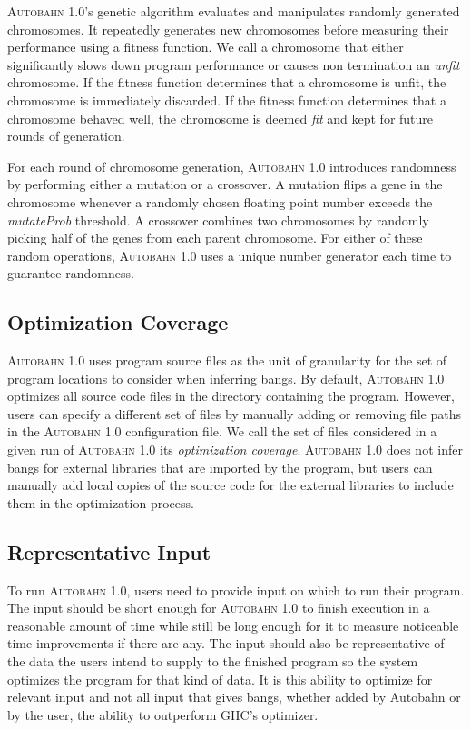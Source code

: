 \documentclass[format=sigplan, review=true, 9pt]{acmart}
\newcommand{\unfit}[0]{unfit}
\newcommand{\Ao}[0]{\textsc{Autobahn 1.0}}
\newcommand{\fit}[0]{fit}
\begin{document}
\Ao{}'s genetic algorithm evaluates and manipulates randomly generated
chromosomes. It repeatedly generates new chromosomes before measuring
their performance using a fitness function. We call a chromosome that
either significantly slows down program performance or causes non
termination an \textit{\unfit{}} chromosome. If the fitness function
determines that a chromosome is \unfit{}, the chromosome is
immediately discarded. If the fitness function determines that a
chromosome behaved well, the chromosome is deemed \textit{\fit{}} and
kept for future rounds of generation.

For each round of chromosome generation, \Ao{} introduces randomness
by performing either a mutation or a crossover. A mutation flips a
gene in the chromosome whenever a randomly chosen floating point
number exceeds the \textit{mutateProb} threshold. A crossover combines
two chromosomes by randomly picking half of the genes from each parent
chromosome. For either of these random operations, \Ao{} uses a unique
number generator each time to guarantee randomness.

\subsection{Optimization Coverage}
\Ao{} uses program source files as the unit of granularity for 
the set of program locations to consider when inferring bangs.  By
default, \Ao{} optimizes all source code files in the directory
containing the program. However, users can specify a different set of
files by manually adding or removing file paths in the \Ao{}
configuration file.  We call the set of files considered in a given
run of \Ao{} its \textit{optimization coverage}.
\Ao{} does not infer bangs for external libraries
that are imported by the program, but users can manually add local
copies of the source code for the external libraries to include them in the optimization process.


\subsection{Representative Input}
To run \Ao{}, users need to provide input on which to run their
program. The input should be short enough for \Ao{} to finish
execution in a reasonable amount of time while still be long enough
for it to measure noticeable time improvements if there are
any.  The input should also be representative of the data the users
intend to supply to the finished program so the system optimizes the
program for that kind of data.  It is this ability to optimize for
relevant input and not all input that gives bangs, whether added by
Autobahn or by the user, the ability to outperform GHC's optimizer. 
\end{document}
